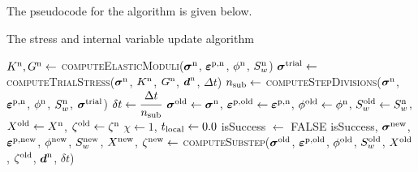 The pseudocode for the algorithm is given below.
\begin{breakablealgorithm}
  \caption{The stress and internal variable update algorithm}
  \begin{algorithmic}[1]
      \State $K^{\text{n}}, G^{\text{n}} \leftarrow$ \textsc{computeElasticModuli}($\boldsymbol{\sigma}^{\text{n}}$, $\boldsymbol{\varepsilon}^{\text{p},\text{n}}$,
                                                                 $\phi^{\text{n}}$, $S_w^{\text{n}}$)
      \State $\boldsymbol{\sigma}^{\text{trial}} \leftarrow$ \textsc{computeTrialStress}($\boldsymbol{\sigma}^{\text{n}}$, $K^{\text{n}}$, $G^{\text{n}}$,
                                                                  $\boldsymbol{d}^{\text{n}}$, $\Delta t$)
      \State $n_{\text{sub}} \leftarrow $ \textsc{computeStepDivisions}($\boldsymbol{\sigma}^{\text{n}}$, $\boldsymbol{\varepsilon}^{\text{p},\text{n}}$,
                                                                $\phi^{\text{n}}$, $S_w^{\text{n}}$,
                                                                $\boldsymbol{\sigma}^{\text{trial}}$)
      \State $\delta t \leftarrow \cfrac{\Delta t}{n_{\text{sub}}}$
      \State $\boldsymbol{\sigma}^{\text{old}} \leftarrow \boldsymbol{\sigma}^{\text{n}}$, $\boldsymbol{\varepsilon}^{\text{p},\text{old}} \leftarrow \boldsymbol{\varepsilon}^{\text{p},\text{n}}$,
             $\phi^{\text{old}} \leftarrow \phi^{\text{n}}$, $S_w^{\text{old}} \leftarrow S_w^{\text{n}}$,
             $X^{\text{old}} \leftarrow X^{\text{n}}$, $\zeta^{\text{old}} \leftarrow \zeta^{\text{n}}$ 
      \State $\chi \leftarrow 1$, $t_{\text{local}} \leftarrow 0.0$
      \State isSuccess $\leftarrow$ FALSE
      \Repeat
        \State isSuccess, $\boldsymbol{\sigma}^{\text{new}}$, $\boldsymbol{\varepsilon}^{\text{p},\text{new}}$, $\phi^{\text{new}}$, $S_w^{\text{new}}$, $X^{\text{new}}$, $\zeta^{\text{new}} \leftarrow$
          \textsc{computeSubstep}($\boldsymbol{\sigma}^{\text{old}}$, $\boldsymbol{\varepsilon}^{\text{p},\text{old}}$, $\phi^{\text{old}}$, $S_w^{\text{old}}$, 
                                  $X^{\text{old}}$, $\zeta^{\text{old}}$, $\boldsymbol{d}^{\text{n}}$, $\delta t$)
        

\end{algorithmic}
\end{breakablealgorithm}
